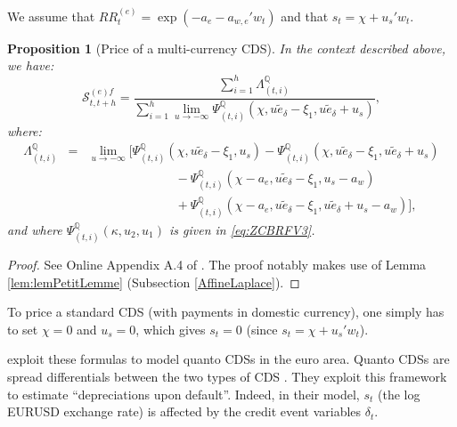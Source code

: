 \documentclass[
  12pt,
]{book}
\newtheorem{proposition}{Proposition}[chapter]
\theoremstyle{definition}
\theoremstyle{definition}
\theoremstyle{definition}
\theoremstyle{definition}
\theoremstyle{remark}
\begin{document}
We assume that \(RR^{(e)}_{t} = \exp \left( - a_{e} - a_{w, e} ' w_t \right)\) and that \(s_t = \chi + u_s ' w_t\).

\begin{proposition}[Price of a multi-currency CDS]
\protect\hypertarget{prp:multicurrencyCDS}{}\label{prp:multicurrencyCDS}In the context described above, we have:
\begin{equation}
\boxed{\mathcal{S}^{(e) f}_{t, t+h} = \frac{\sum_{i=1}^{h} \Lambda^{\mathbb{Q}}_{(t, i)} }{\sum_{i=1}^{h} \lim_{u \to - \infty} \Psi^{\mathbb{Q}}_{(t, i)} \left( \chi, u \tilde{e}_{\delta} - \xi_1 , u \tilde{e}_{\delta} + u_s \right)},}\label{eq:MCCDSformula1}
\end{equation}
where:
\begin{eqnarray*}
\Lambda^{\mathbb{Q}}_{(t, i)} & = & \underset{u \to - \infty}{\lim} \Big[ \Psi^{\mathbb{Q}}_{(t, i)} \left( \chi , u \widetilde{e}_{\delta} - \xi_1 , u_s \right) -
\Psi^{\mathbb{Q}}_{(t, i)} \left( \chi , u \widetilde{e}_{\delta} - \xi_1 , u \widetilde{e}_{\delta} + u_s \right) \\
&& \hspace{7em} - \Psi^{\mathbb{Q}}_{(t, i)} \left(\chi - a_e, u \widetilde{e}_{\delta} - \xi_1 , u_s - a_w \right) \\
&& \hspace{7em} + \Psi^{\mathbb{Q}}_{(t, i)} \left(\chi - a_e, u \widetilde{e}_{\delta} - \xi_1 , u \widetilde{e}_{\delta} + u_s - a_w \right) \Big] ,
\end{eqnarray*}
and where \(\Psi^{\mathbb{Q}}_{(t, i)} \left(\kappa, u_2 , u_1 \right)\) is given in \eqref{eq:ZCBRFV3}.
\end{proposition}

\begin{proof}
See Online Appendix A.4 of \citet{Monfort_Pegoraro_Renne_Roussellet_2021}. The proof notably makes use of Lemma \ref{lem:lemPetitLemme} (Subsection \ref{AffineLaplace}).
\end{proof}

To price a standard CDS (with payments in domestic currency), one simply has to set \(\chi=0\) and \(u_s=0\), which gives \(s_t=0\) (since \(s_t = \chi + u_s ' w_t\)).

\citet{Monfort_Pegoraro_Renne_Roussellet_2021} exploit these formulas to model quanto CDSs in the euro area. Quanto CDSs are spread differentials between the two types of CDS \citep{Augustin_Chernov_Song_2020}. They exploit this framework to estimate ``depreciations upon default''. Indeed, in their model, \(s_t\) (the log EURUSD exchange rate) is affected by the credit event variables \(\delta_t\).
\end{document}
